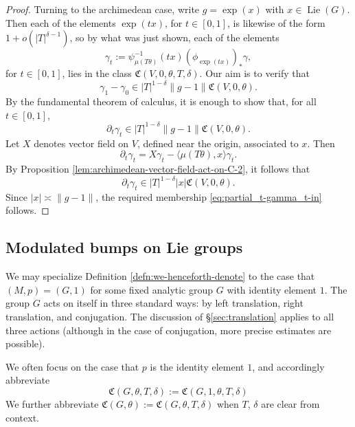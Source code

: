 \documentclass[reqno]{amsart}
\DeclareMathOperator{\Lie}{Lie}
\theoremstyle{plain} \newtheorem{theorem} {Theorem}
\theoremstyle{definition} \newtheorem{definition} [theorem] {Definition}
\theoremstyle{itplain} %
\numberwithin{equation}{section}
\numberwithin{theorem}{section}
\begin{document}
\begin{proof}
Turning to the archimedean case, write $g = \exp(x)$ with $x \in \Lie(G)$.  Then each of the elements $\exp(t x)$, for $t \in [0,1]$, is likewise of the form $1 + o(|T|^{\delta-1})$, so by what was just shown, each of the elements
\begin{equation*}
  \gamma_t := \psi_{\mu(T \theta)}^{-1}(t x) (\phi_{\exp(t x)})_* \gamma,
\end{equation*}
for $t \in [0,1]$, lies in the class $\mathfrak{C}(V,0,\theta,T,\delta)$.  Our aim is to verify that
\begin{equation*}
  \gamma_1 - \gamma_0 \in |T|^{1-\delta} \|g - 1\| \mathfrak{C}(V,0,\theta).
\end{equation*}
By the fundamental theorem of calculus, it is enough to show that, for all $t \in [0,1]$,
\begin{equation}\label{eq:partial_t-gamma_t-in}
  \partial_t \gamma_t  \in |T|^{1-\delta} \|g - 1\| \mathfrak{C}(V,0,\theta).
\end{equation}
Let $X$ denotes vector field on $V$, defined near the origin, associated to $x$.  Then
\begin{equation*}
  \partial_t \gamma_t
  =
  X
  \gamma_t
  -
  \langle \mu(T \theta), x \rangle \gamma_t.
\end{equation*}
By Proposition \ref{lem:archimedean-vector-field-act-on-C-2}, it follows that
\begin{equation*}
  \partial_t \gamma_t \in |T|^{1 - \delta} |x| \mathfrak{C}(V,0,\theta).
\end{equation*}
Since $|x| \asymp \|g-1\|$, the required membership \eqref{eq:partial_t-gamma_t-in} follows.
\end{proof}


\subsection{Modulated bumps on Lie groups}\label{sec:spec-group-sett}
We may specialize Definition \ref{defn:we-henceforth-denote} to the case that $(M,p) = (G,1)$ for some fixed analytic group $G$ with identity element $1$.  The group $G$ acts on itself in three standard ways: by left translation, right translation, and conjugation.  The discussion of \S\ref{sec:translation} applies to all three actions (although in the case of conjugation, more precise estimates are possible).

We often focus on the case that $p$ is the identity element $1$, and accordingly abbreviate 
\begin{equation}\label{eq:mathfrakcg-theta-t}
\mathfrak{C}(G,\theta,T,\delta) := \mathfrak{C}(G,1,\theta,T,\delta)
\end{equation}
 We further abbreviate $\mathfrak{C}(G,\theta) := \mathfrak{C}(G, \theta, T,\delta)$ when $T$, $\delta$ are clear from context.
\end{document}
